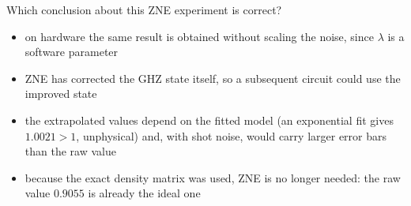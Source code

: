 \documentclass[11pt,a4paper]{article}
\newcommand{\optlabel}[1]{\textbf{(#1)}}
\newenvironment{qitem}[1]{\begin{list}{}{\setlength{\leftmargin}{3.3em}\setlength{\labelwidth}{3.1em}%
  \setlength{\labelsep}{0.2em}\setlength{\topsep}{3pt}\setlength{\parsep}{3pt}}\item[\textbf{Q.#1}\hfill]}{\end{list}}
\newcommand{\qsep}{\par\vspace{2pt}{\color{black!15}\hrule}\vspace{4pt}}
\begin{document}
\begin{qitem}{80}
Which conclusion about this ZNE experiment is correct?
\begin{itemize}[leftmargin=2.6em, labelsep=0.4em, itemsep=2pt, topsep=3pt]
\item[\optlabel{A}] on hardware the same result is obtained without scaling the noise, since $\lambda$ is a software parameter
\item[\optlabel{B}] ZNE has corrected the GHZ state itself, so a subsequent circuit could use the improved state
\item[\optlabel{C}] the extrapolated values depend on the fitted model (an exponential fit gives $1.0021 > 1$, unphysical) and, with shot noise, would carry larger error bars than the raw value
\item[\optlabel{D}] because the exact density matrix was used, ZNE is no longer needed: the raw value $0.9055$ is already the ideal one
\end{itemize}
\end{qitem}
\qsep

\newpage
\end{document}
